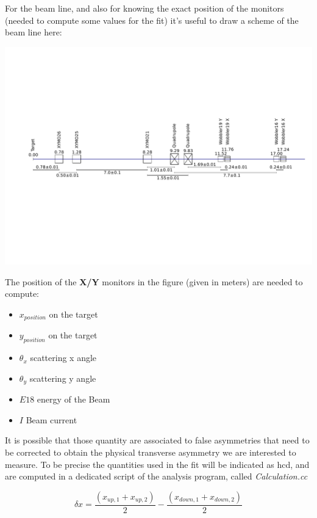 \documentclass[10pt,a4paper]{article}
\begin{document}
For the beam line, and also for knowing the exact position of the monitors (needed to compute some values for the fit) it's useful to draw a scheme of the beam line here:

\begin{center}
\includegraphics[scale=0.4]{figures/XYMOCalibBeamLine.svg.pdf} 
\end{center}

The position of the \textbf{X/Y} monitors in the figure (given in meters) are needed to compute: 

\begin{itemize}
\item $x_{position}$ on the target
\item $y_{position}$ on the target
\item $\theta_{x}$ scattering x angle
\item $\theta_{y}$ scattering y angle 
\item $E18$ energy of the Beam
\item $I$ Beam current
\end{itemize}

It is possible that those quantity are associated to false asymmetries that need to be corrected to obtain the physical transverse asymmetry we are interested to measure. To be precise the quantities used in the fit will be indicated as hcd, and are computed in a dedicated script of the analysis program, called \textit{Calculation.cc}

\begin{equation}
\delta x =  \frac{(x_{up,1} + x_{up,2})}{2} - \frac{(x_{down,1} + x_{down,2})}{2}
\end{equation}
\end{document}
